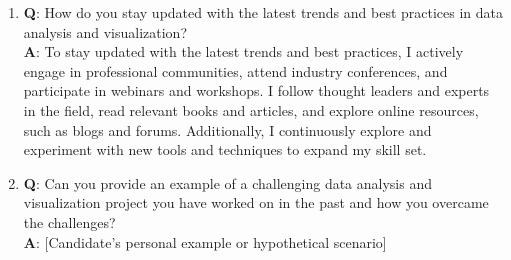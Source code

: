 \begin{enumerate}
	\item \textbf{Q}: How do you stay updated with the latest trends and best practices in data analysis and visualization? \\
	\textbf{A}: To stay updated with the latest trends and best practices, I actively engage in professional communities, attend industry conferences, and participate in webinars and workshops. I follow thought leaders and experts in the field, read relevant books and articles, and explore online resources, such as blogs and forums. Additionally, I continuously explore and experiment with new tools and techniques to expand my skill set.
	
	\item \textbf{Q}: Can you provide an example of a challenging data analysis and visualization project you have worked on in the past and how you overcame the challenges? \\
	\textbf{A}:  [Candidate's personal example or hypothetical scenario]
	
\end{enumerate}